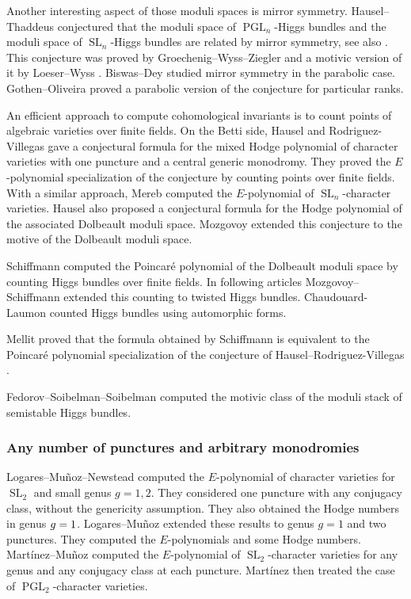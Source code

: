 \documentclass[11pt]{article}
\theoremstyle{definition}
\theoremstyle{plain}
\DeclareMathOperator{\SL}{SL}
\DeclareMathOperator{\PGL}{PGL}
\begin{document}
Another interesting aspect of those moduli spaces is mirror symmetry. Hausel--Thaddeus \cite{Hausel_Thaddeus_mirror01,Hausel_Thaddeus_mirror} conjectured that the moduli space of $\PGL_n$-Higgs bundles and the moduli space of $\SL_n$-Higgs bundles are related by mirror symmetry, see also \cite{Hausel_mirror}. This conjecture was proved by Groechenig--Wyss--Ziegler \cite{Groechenig_Wyss_Ziegler_mirror} and a motivic version of it by Loeser--Wyss \cite{Loeser_Wyss}. Biswas--Dey \cite{Biswas_Dey} studied mirror symmetry in the parabolic case.
Gothen--Oliveira \cite{Gothen_Oliveira} proved a parabolic version of the conjecture for particular ranks.

An efficient approach to compute cohomological invariants is to count points of algebraic varieties over finite fields. On the Betti side, Hausel and Rodriguez-Villegas \cite{Hausel_Villegas} gave a conjectural formula for the mixed Hodge polynomial of character varieties with one puncture and a central generic monodromy. They proved the $E$\nobreakdash-poly\-nomial specialization of the conjecture by counting points over finite fields. With a similar approach, Mereb \cite{Mereb} computed the $E$-polynomial of $\SL_n$-character varieties. Hausel \cite{Hausel_mirror} also proposed a conjectural formula for the Hodge polynomial of the associated Dolbeault moduli space. Mozgovoy \cite{Mozgovoy12} extended this conjecture to the motive of the Dolbeault moduli space.

Schiffmann \cite{Schiffmann16} computed the Poincaré polynomial of the Dolbeault moduli space by counting Higgs bundles over finite fields. In following articles \cite{Mozgovoy_Schiffmann_14,Mozgovoy_Schiffmann_2020} Mozgovoy--Schiffmann extended this counting to twisted Higgs bundles. Chaudouard-Laumon \cite{Chaudouard_Laumon_2016} counted Higgs bundles using automorphic forms.

Mellit \cite{Mellit2017} proved that the formula obtained by Schiffmann \cite{Schiffmann16} is equivalent to the Poincaré polynomial specialization of the conjecture of Hausel--Rodriguez-Villegas \cite{Hausel_Villegas}.

Fedorov--Soibelman--Soibelman \cite{Fedorov_Soibelman_Soibelman} computed the motivic class of the moduli stack of semistable Higgs bundles.

\subsubsection{Any number of punctures and arbitrary monodromies}
Logares--Muñoz--New\-stead \cite{Logares_Munoz_Newstead} computed the $E$-polynomial of character varieties for $\SL_2$ and small genus $g=1,2$. They considered one puncture with any conjugacy class, without the genericity assumption. They also obtained the Hodge numbers in genus $g=\nobreak1$.
Logares--Muñoz \cite{Logares_Munoz} extended these results to genus $g=1$ and two punctures. They computed the $E$-polynomials and some Hodge numbers.
Martínez--Muñoz \cite{Martinez_Munoz_14,Martinez_Munoz_14_b} computed the $E$-polynomial of $\SL_2$-character varieties for any genus and any conjugacy class at each puncture. Martínez \cite{Martinez2017} then treated the case of $\PGL_2$-character varieties.
\end{document}
